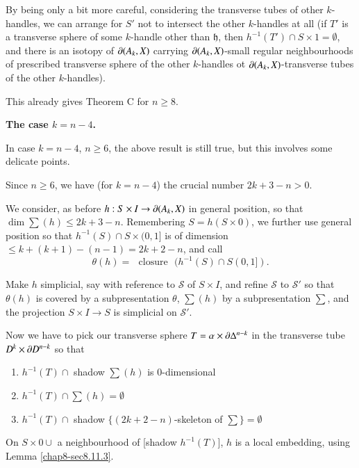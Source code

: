 By being only a bit more careful, considering the transverse tubes of other $k$-handles, we can arrange for $S'$ not to intersect the other $k$-handles at all (if $T'$ is a transverse sphere of some $k$-handle other than $\mathfrak{h}$, then $h^{-1}(T')\cap S\times 1=\emptyset$, and there is an isotopy of $\partial(A_{k},X)$ carrying $\partial(A_{k},X)$-small regular neighbourhoods of prescribed transverse sphere of the other $k$-handles ot $\partial(A_{k},X)$-transverse tubes of the other $k$-handles).

\begin{remark*}
This already gives Theorem C for $n\geq 8$.
\end{remark*}

\noindent
{\bf The case {\boldmath$k=n-4$}.}

In case $k=n-4$, $n\geq 6$, the above result is still true, but this involves some delicate points.

Since $n\geq 6$, we have (for $k=n-4$) the crucial number $2k+3-n>0$.

We consider, as before $h:S\times I\to \partial(A_{k},X)$ in general position, so that $\dim \sum (h)\leq 2k+3-n$. Remembering $S=h(S\times 0)$, we further use general position so that $h^{-1}(S)\cap S\times (0,1]$ is of dimension $\leq k+(k+1)-(n-1)=2k+2-n$, and call 
$$
\theta (h)=\text{~ closure~ }(h^{-1}(S)\cap S(0,1]).
$$\pageoriginale 

Make $h$ simplicial, say with reference to $\mathscr{S}$ of $S\times I$, and refine $\mathscr{S}$ to $\mathscr{S}'$ so that $\theta(h)$ is covered by a subpresentation $\theta$, $\sum(h)$ by a subpresentation $\sum$, and the projection $S\times I\to S$ is simplicial on $\mathscr{S}'$.

Now we have to pick our transverse sphere $T=\alpha\times \partial \Delta^{n-k}$ in the transverse tube $D^{k}\times \partial D^{n-k}$ so that 
\begin{enumerate}
\renewcommand{\labelenumi}{(\theenumi)}
\item $h^{-1}(T)\cap $ shadow $\sum(h)$ is $0$-dimensional

\item $h^{-1}(T)\cap \sum(h)=\emptyset$

\item $h^{-1}(T)\cap$ shadow $\{(2k+2-n)$-skeleton of $\sum\}=\emptyset$
\end{enumerate}

On $S\times 0\cup$ a neighbourhood of [shadow $h^{-1}(T)$], $h$ is a local embedding, using Lemma \ref{chap8-sec8.11.3}.


